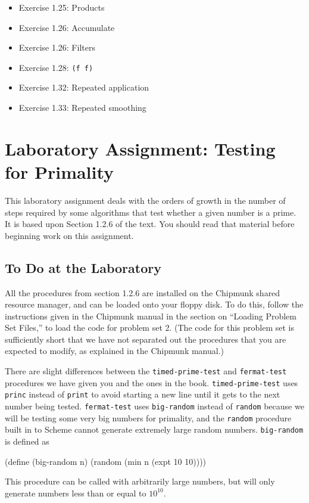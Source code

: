 \begin{itemize}
\item Exercise 1.25: Products
\item Exercise 1.26: Accumulate
\item Exercise 1.26: Filters
\item Exercise 1.28: {\tt (f f)}
\item Exercise 1.32: Repeated application
\item Exercise 1.33: Repeated smoothing
\end{itemize}

\section{Laboratory Assignment: Testing for Primality}

This laboratory assignment deals with the orders of growth in the
number of steps required by some algorithms that test whether a given
number is a prime.  It is based upon Section 1.2.6 of the text.  You
should read that material before beginning work on this assignment.

\subsection{To Do at the Laboratory}

All the procedures from section 1.2.6 are installed on the
Chipmunk shared resource manager, and can be loaded onto your floppy
disk.  To do this, follow the instructions given in the Chipmunk
manual in the section on ``Loading Problem Set Files,'' to load the
code for problem set 2.  (The code for this problem set is
sufficiently short that we have not separated out the procedures that
you are expected to modify, as explained in the Chipmunk manual.)

There are slight differences between the {\tt timed-prime-test} and
{\tt fermat-test} procedures we have given you and the ones in the book.
{\tt timed-prime-test} uses {\tt princ} instead of {\tt print} to avoid
starting a new line until it gets to the next number being tested.
{\tt fermat-test} uses {\tt big-random} instead of {\tt random} because we
will be testing some very big numbers for primality, and the
{\tt random} procedure built in to Scheme cannot generate extremely
large random numbers.  {\tt big-random} is defined as

\beginlisp
(define (big-random n)
  (random (min n (expt 10 10))))
\endlisp

This procedure can be called with arbitrarily large numbers, but will
only generate numbers less than or equal to $10^{10}$.

